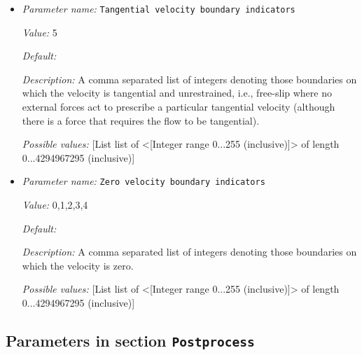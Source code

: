 \begin{itemize}
{\it Default:} 


{\it Description:} A selection of operations to remove certain parts of the nullspace from the velocity after solving. For some geometries and certain boundary conditions the velocity field is not uniquely determined but contains free translations and or rotations. Depending on what you specify here, these non-determined modes will be removed from the velocity field at the end of the Stokes solve step.
Note that while more than operation can be selected it only makes sense to pick one rotational and one translational operation.


{\it Possible values:} [MultipleSelection net rotation|net translation|angular momentum|translational momentum ]
\item {\it Parameter name:} {\tt Tangential velocity boundary indicators}


{\it Value:} 5


{\it Default:} 


{\it Description:} A comma separated list of integers denoting those boundaries on which the velocity is tangential and unrestrained, i.e., free-slip where no external forces act to prescribe a particular tangential velocity (although there is a force that requires the flow to be tangential).


{\it Possible values:} [List list of <[Integer range 0...255 (inclusive)]> of length 0...4294967295 (inclusive)]
\item {\it Parameter name:} {\tt Zero velocity boundary indicators}


{\it Value:} 0,1,2,3,4


{\it Default:} 


{\it Description:} A comma separated list of integers denoting those boundaries on which the velocity is zero.


{\it Possible values:} [List list of <[Integer range 0...255 (inclusive)]> of length 0...4294967295 (inclusive)]
\end{itemize}

\subsection{Parameters in section \tt Postprocess}
\label{parameters:Postprocess}

